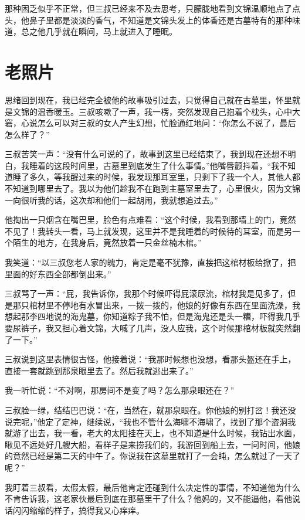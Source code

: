 那种困乏似乎不正常，但三叔已经来不及去思考，只朦胧地看到文锦温顺地点了点头，他鼻子里都是淡淡的香气，不知道是文锦头发上的体香还是古墓特有的那种味道，总之他几乎就在瞬间，马上就进入了睡眠。

\chapter{老照片}

思绪回到现在，我已经完全被他的故事吸引过去，只觉得自己就在古墓里，怀里就是文锦的温香暖玉。三叔咳嗽了一声，我一楞，突然发现自己抱着个枕头，心中大窘，心说怎么可以对三叔的女人产生幻想，忙脸通红地问：“你怎么不说了，最后怎么样了？”

三叔苦笑一声：“没有什么可说的了，故事到这里已经结束了，我到现在还想不明白，我睡着的这段时间里，古墓里到底发生了什么事情。”他嘴唇颤抖着，“我不知道睡了多久，等我醒过来的时候，我发现那耳室里，只剩下了我一个人，其他人都不知道到哪里去了。我以为他们趁我不在跑到主墓室里去了，心里很火，因为文锦一向很听我的话，这次却和他们一起胡闹，我就想追过去。”

他掏出一只烟含在嘴巴里，脸色有点难看：“这个时候，我看到那墙上的门，竟然不见了！我转头一看，马上就发现，这里并不是我睡着的时候待的耳室，而是另一个陌生的地方，在我身后，竟然放着一只金丝楠木棺。”

我笑道：“以三叔您老人家的魄力，肯定是毫不犹豫，直接把这棺材板给掀了，把里面的好东西全部都倒出来。”

三叔骂了一声：“屁，我告诉你，我那个时候吓得屁滚尿流，棺材我是见多了，但是那只棺材里不停地有水冒出来，一拨一拨的，他娘的好像有东西在里面洗澡，我想起那李四地说的海鬼墓，你知道粽子我不怕，但是海鬼还是头一糟，吓得我几乎要尿裤子，我又担心着文锦，大喊了几声，没人应我，这个时候那棺材板就突然翻了一下。”

三叔说到这里表情很古怪，他接着说：“我那时候想也没想，看那头盔还在手上，直接一套就跳到那泉眼里去了。然后我就逃出来了。”

我一听忙说：“不对啊，那房间不是变了吗？怎么那泉眼还在？”

三叔脸一绿，结结巴巴说：“在，当然在，就那泉眼在。你他娘的别打岔！我还没说完呢，”他定了定神，继续说，“我也不管什么海啸不海啸了，找到了那个盗洞我就游了出去，我一看，老大的太阳挂在天上，也不知道是什么时候，我钻出水面，瞅见不远处好几艘大船，看样子是来捞我们的，我游回到船上去，一问时间，他娘的竟然已经是第二天的中午了。你说我在这墓里就打了一会盹，怎么就过了一天了呢？”

我盯着三叔看，太假太假，最后他肯定还碰到什么决定性的事情，不知道他为什么不肯告诉我，这老家伙最后到底在那墓里干了什么？他妈的，又不能逼他，看他说话闪闪缩缩的样子，搞得我又心痒痒。

